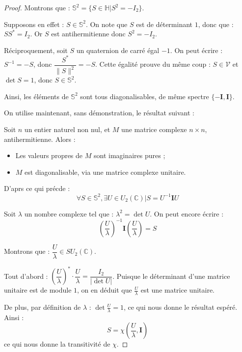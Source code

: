 \begin{proof}
Montrons que : $\mathbb{S}^2=\{S\in\mathbb{H}|S^2=-I_2\}$.

\par
Supposons en effet : $S\in\mathbb{S}^2$. On note que $S$ est de d\'eterminant $1$, donc que : $SS^{\ast}=I_2$. Or $S$ est antihermitienne donc $S^2=-I_2$.

\par
R\'eciproquement, soit $S$ un quaternion de carr\'e \'egal  $-1$. On peut \'ecrire : $S^{-1}=-S$, donc $\dfrac{S^{\ast}}{\|S\|^2}=-S$. %
Cette \'egalit\'e prouve du m\^eme coup : $S\in\mathcal{V}$ et $\det S=1$, donc $S\in\mathbb{S}^2$.

\par
Ainsi, les \'el\'ements de $\mathbb{S}^2$ sont tous diagonalisables, de m\^eme spectre $\{-\mathbf{I},\mathbf{I}\}$.

\par
On utilise maintenant, sans d\'emonstration, le r\'esultat suivant :

\begin{prop}
Soit $n$ un entier naturel non nul, et $M$ une matrice complexe $n\times n$, antihermitienne. Alors :
\begin{itemize}
\item Les valeurs propres de $M$ sont imaginaires pures ;
\item $M$ est diagonalisable, via une matrice complexe unitaire.
\end{itemize}
\end{prop}

D'aprs ce qui pr\'ecde :
\[\forall S\in\mathbb{S}^2,\exists U\in U_2(\mathbb{C})|S=U^{-1}\mathbf{I}U\]

Soit $\lambda$ un nombre complexe tel que : $\lambda^2=\det U$. On peut encore \'ecrire :
\[\left(\dfrac{U}{\lambda}\right)^{-1}\mathbf{I}\left(\dfrac{U}{\lambda}\right)=S\]

Montrons que : $\dfrac{U}{\lambda}\in SU_2(\mathbb{C})$.

\par
Tout d'abord : $\left(\dfrac{U}{\lambda}\right)^{\ast}\cdot\dfrac{U}{\lambda}=\dfrac{I_2}{|\det U|}$. %
Puisque le d\'eterminant d'une matrice unitaire est de module $1$, on en d\'eduit que $\frac{U}{\lambda}$ est une matrice unitaire.

\par
De plus, par d\'efinition de $\lambda$ : $\det \frac{U}{\lambda}=1$, ce qui nous donne le r\'esultat esp\'er\'e. Ainsi :
\[S=\chi\left(\frac{U}{\lambda},\mathbf{I}\right)\]
ce qui nous donne la transitivit\'e de $\chi$.


\end{proof}

